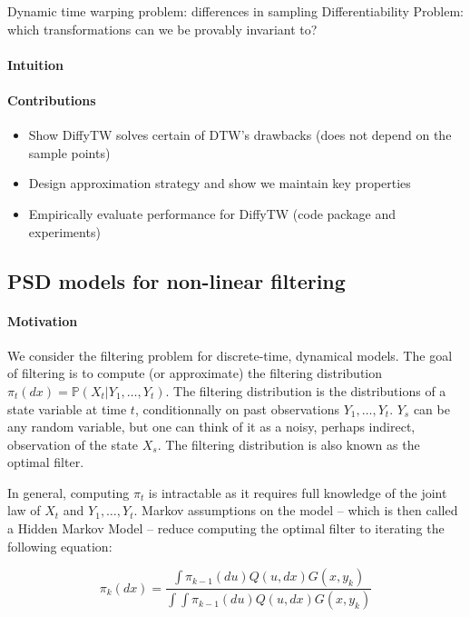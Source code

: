 Dynamic time warping problem: differences in sampling
Differentiability
Problem: which transformations can we be provably invariant to?

\paragraph{Intuition}

\paragraph{Contributions}
\begin{itemize}
\item Show DiffyTW solves certain of DTW's drawbacks (does not depend on the sample points)
\item Design approximation strategy and show we maintain key properties
\item Empirically evaluate performance for DiffyTW (code package and experiments)
\end{itemize}

\newpage
\subsection{PSD models for non-linear filtering}

\paragraph{Motivation}
We consider the filtering problem for discrete-time, dynamical models. The goal of filtering is to compute (or approximate) the filtering distribution $\pi_t(dx) = \mathbb P(X_t\vert Y_1, \ldots, Y_{t})$. The filtering distribution is the distributions of a state variable at time $t$, conditionnally on past observations $Y_1, \ldots, Y_t$. $Y_s$ can be any random variable, but one can think of it as a noisy, perhaps indirect, observation of the state $X_s$. The filtering distribution is also known as the optimal filter.

In general, computing $\pi_t$ is intractable as it requires full knowledge of the joint law of $X_t$  and $Y_1, \ldots, Y_t$. Markov assumptions on the model -- which is then called a Hidden Markov Model -- reduce computing the optimal filter to iterating the following equation:

\begin{equation}\label{eq:intro-hmm-iteration}
\pi_k(dx) = \frac{\int \pi_{k-1}(du)Q(u, dx)G(x, y_k)}{\int \int \pi_{k-1}(du)Q(u, dx)G(x, y_k)}
\end{equation}

